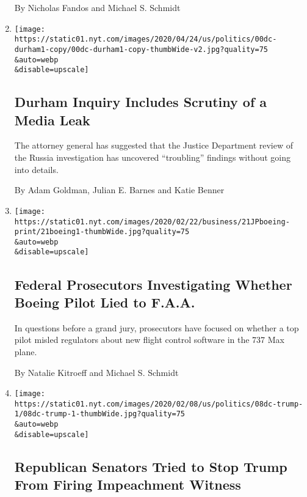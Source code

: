 \begin{enumerate}
  By Nicholas Fandos and Michael S. Schmidt
\item
  \href{/2020/04/24/us/politics/john-durham-ignatius-column.html}{}

  \texttt{[image: https://static01.nyt.com/images/2020/04/24/us/politics/00dc-durham1-copy/00dc-durham1-copy-thumbWide-v2.jpg?quality=75\\\&auto=webp\\\&disable=upscale]}

  \hypertarget{durham-inquiry-includes-scrutiny-of-a-media-leak}{%
  \subsection{Durham Inquiry Includes Scrutiny of a Media
  Leak}\label{durham-inquiry-includes-scrutiny-of-a-media-leak}}

  The attorney general has suggested that the Justice Department review
  of the Russia investigation has uncovered ``troubling'' findings
  without going into details.

  By Adam Goldman, Julian E. Barnes and Katie Benner
\item
  \href{/2020/02/21/business/boeing-737-max-investigation.html}{}

  \texttt{[image: https://static01.nyt.com/images/2020/02/22/business/21JPboeing-print/21boeing1-thumbWide.jpg?quality=75\\\&auto=webp\\\&disable=upscale]}

  \hypertarget{federal-prosecutors-investigating-whether-boeing-pilot-lied-to-faa}{%
  \subsection{Federal Prosecutors Investigating Whether Boeing Pilot
  Lied to
  F.A.A.}\label{federal-prosecutors-investigating-whether-boeing-pilot-lied-to-faa}}

  In questions before a grand jury, prosecutors have focused on whether
  a top pilot misled regulators about new flight control software in the
  737 Max plane.

  By Natalie Kitroeff and Michael S. Schmidt
\item
  \href{/2020/02/08/us/politics/trump-vindman-sondland-fired.html}{}

  \texttt{[image: https://static01.nyt.com/images/2020/02/08/us/politics/08dc-trump-1/08dc-trump-1-thumbWide.jpg?quality=75\\\&auto=webp\\\&disable=upscale]}

  \hypertarget{republican-senators-tried-to-stop-trump-from-firing-impeachment-witness}{%
  \subsection{Republican Senators Tried to Stop Trump From Firing
  Impeachment
  Witness}\label{republican-senators-tried-to-stop-trump-from-firing-impeachment-witness}}


\end{enumerate}
